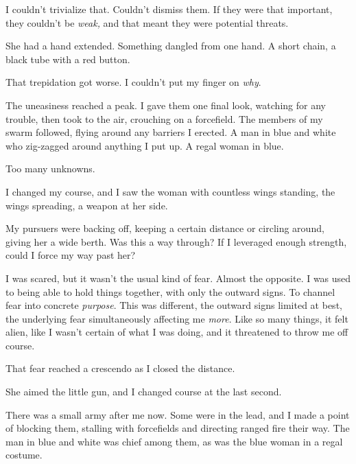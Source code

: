 I couldn't trivialize that.  Couldn't dismiss them.  If they were that important, they couldn't be \emph{weak, }and that meant they were potential threats.



She had a hand extended.  Something dangled from one hand.  A short chain, a black tube with a red button.



That trepidation got worse.  I couldn't put my finger on \emph{why}.



The uneasiness reached a peak.  I gave them one final look, watching for any trouble, then took to the air, crouching on a forcefield.  The members of my swarm followed, flying around any barriers I erected.  A man in blue and white who zig-zagged around anything I put up.  A regal woman in blue.



Too many unknowns.



I changed my course, and I saw the woman with countless wings standing, the wings spreading, a weapon at her side.



My pursuers were backing off, keeping a certain distance or circling around, giving her a wide berth.  Was this a way through?  If I leveraged enough strength, could I force my way past her?



I was scared, but it wasn't the usual kind of fear.  Almost the opposite.  I was used to being able to hold things together, with only the outward signs.  To channel fear into concrete \emph{purpose}.  This was different, the outward signs limited at best, the underlying fear simultaneously affecting me \emph{more}.  Like so many things, it felt alien, like I wasn't certain of what I was doing, and it threatened to throw me off course.



That fear reached a crescendo as I closed the distance.



She aimed the little gun, and I changed course at the last second.



There was a small army after me now.  Some were in the lead, and I made a point of blocking them, stalling with forcefields and directing ranged fire their way.  The man in blue and white was chief among them, as was the blue woman in a regal costume.



